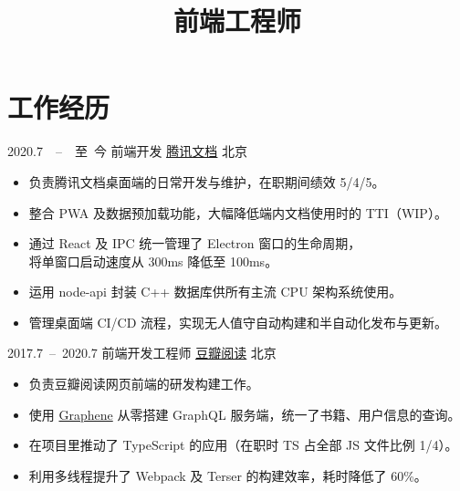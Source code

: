 \documentclass[11pt,a4paper,roman]{moderncv}   %
\title{前端工程师}                     %
\begin{document}
\maketitle


\section{工作经历}
\cventry
{2020.7\ \ –\ \ 至\ 今}
{前端开发}
{\href{https://docs.qq.com}{\underline{腾讯文档}}}
{北京}
{}
{
  \begin{itemize}
  \item 负责腾讯文档桌面端的日常开发与维护，在职期间绩效 5/4/5。
  \item 整合 PWA 及数据预加载功能，大幅降低端内文档使用时的 TTI（WIP）。
  \item 通过 React 及 IPC 统一管理了 Electron 窗口的生命周期，\\将单窗口启动速度从 300ms 降低至 100ms。
  \item 运用 node-api 封装 C++ 数据库供所有主流 CPU 架构系统使用。 
  \item 管理桌面端 CI/CD 流程，实现无人值守自动构建和半自动化发布与更新。
  \end{itemize}
}

\vspace{5pt}

\cventry
{2017.7\ –\ 2020.7}
{前端开发工程师}
{\href{https://read.douban.com}{\underline{豆瓣阅读}}}
{北京}
{}
{
  \begin{itemize}
  \item 负责豆瓣阅读网页前端的研发构建工作。
  \item 使用 \href{https://graphene-python.org/}{Graphene} 从零搭建 GraphQL 服务端，统一了书籍、用户信息的查询。
  \item 在项目里推动了 TypeScript 的应用（在职时 TS 占全部 JS 文件比例 1/4）。
  \item 利用多线程提升了 Webpack 及 Terser 的构建效率，耗时降低了 60\%。
  \end{itemize}
}

\vspace{5pt}

\end{document}
